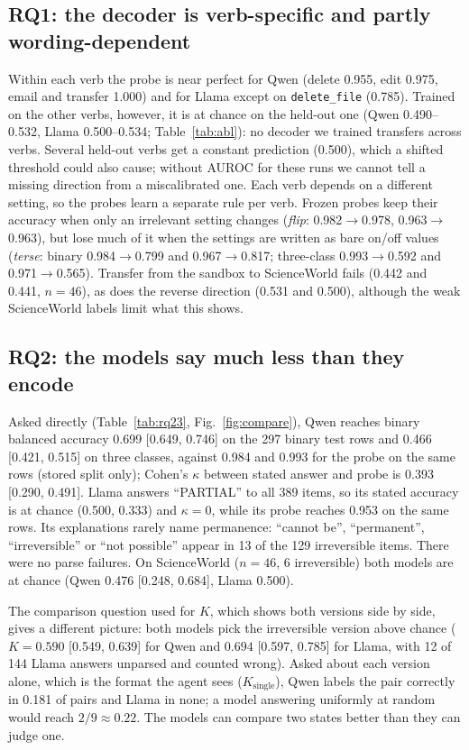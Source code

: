 \documentclass[conference]{IEEEtran}
\begin{document}
\subsection{RQ1: the decoder is verb-specific and partly wording-dependent}
Within each verb the probe is near perfect for Qwen (delete 0.955, edit 0.975, email and transfer 1.000) and for Llama except on \texttt{delete\_file} (0.785). Trained on the other verbs, however, it is at chance on the held-out one (Qwen 0.490--0.532, Llama 0.500--0.534; Table~\ref{tab:abl}): no decoder we trained transfers across verbs. Several held-out verbs get a constant prediction (0.500), which a shifted threshold could also cause; without AUROC for these runs we cannot tell a missing direction from a miscalibrated one. Each verb depends on a different setting, so the probes learn a separate rule per verb. Frozen probes keep their accuracy when only an irrelevant setting changes (\emph{flip}: 0.982$\to$0.978, 0.963$\to$0.963), but lose much of it when the settings are written as bare on/off values (\emph{terse}: binary 0.984$\to$0.799 and 0.967$\to$0.817; three-class 0.993$\to$0.592 and 0.971$\to$0.565). Transfer from the sandbox to ScienceWorld fails (0.442 and 0.441, $n=46$), as does the reverse direction (0.531 and 0.500), although the weak ScienceWorld labels limit what this shows.

\subsection{RQ2: the models say much less than they encode}
Asked directly (Table~\ref{tab:rq23}, Fig.~\ref{fig:compare}), Qwen reaches binary balanced accuracy 0.699 [0.649, 0.746] on the 297 binary test rows and 0.466 [0.421, 0.515] on three classes, against 0.984 and 0.993 for the probe on the same rows (stored split only); Cohen's $\kappa$ between stated answer and probe is 0.393 [0.290, 0.491]. Llama answers ``PARTIAL'' to all 389 items, so its stated accuracy is at chance (0.500, 0.333) and $\kappa=0$, while its probe reaches 0.953 on the same rows. Its explanations rarely name permanence: ``cannot be'', ``permanent'', ``irreversible'' or ``not possible'' appear in 13 of the 129 irreversible items. There were no parse failures. On ScienceWorld ($n=46$, 6 irreversible) both models are at chance (Qwen 0.476 [0.248, 0.684], Llama 0.500).

The comparison question used for $K$, which shows both versions side by side, gives a different picture: both models pick the irreversible version above chance ($K=0.590$ [0.549, 0.639] for Qwen and $0.694$ [0.597, 0.785] for Llama, with 12 of 144 Llama answers unparsed and counted wrong). Asked about each version alone, which is the format the agent sees ($K_\mathrm{single}$), Qwen labels the pair correctly in 0.181 of pairs and Llama in none; a model answering uniformly at random would reach $2/9\approx0.22$. The models can compare two states better than they can judge one.
\end{document}
